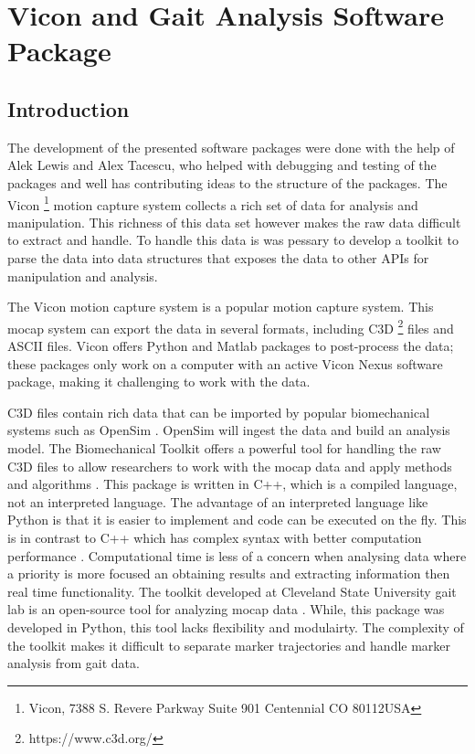 \chapter{Vicon and Gait Analysis Software Package}
\label{chap:software}
\section{Introduction}

The development of the presented software packages were done with the help of Alek Lewis and Alex Tacescu, who helped with debugging and testing of the packages and well has contributing ideas to the structure of the packages. The Vicon \footnote{Vicon, 7388 S. Revere Parkway Suite 901 Centennial CO 80112USA} motion capture system collects a rich set of data for analysis and manipulation. This richness of this data set however makes the raw data difficult to extract and handle. To handle this data is was pessary to develop a toolkit to parse the data into data structures that exposes the data to other APIs for manipulation and analysis. 

The Vicon motion capture system is a popular motion capture system. This mocap system can export the data in several formats, including C3D \footnote{https://www.c3d.org/}  files and ASCII files. Vicon offers Python and Matlab packages to post-process the data; these packages only work on a computer with an active Vicon Nexus software package, making it challenging to work with the data. 

C3D files contain rich data that can be imported by popular biomechanical systems such as OpenSim \cite{seth2018opensim}. OpenSim will ingest the data and build an analysis model. The Biomechanical Toolkit offers a powerful tool for handling the raw C3D files to allow researchers to work with the mocap data and apply methods and algorithms \cite{barre2014biomechanical}. This package is written in C++, which is a compiled language, not an interpreted language. The advantage of an  interpreted language like Python is that it is easier to implement and code can be executed on the fly. This is in contrast to C++ which has complex syntax with better computation performance \cite{varisteas2018distributed} \cite{bargiacchi2020ai}. Computational time is less of a concern when analysing data where a priority is more focused an obtaining results and extracting information then real time functionality. The toolkit developed at Cleveland State University gait lab is an open-source tool for analyzing mocap data  \cite{DTK2014} \cite{GATK2014}. While, this package was developed in Python, this tool lacks flexibility and modulairty. The complexity of the toolkit makes it difficult to separate marker trajectories and handle marker analysis from gait data.   

